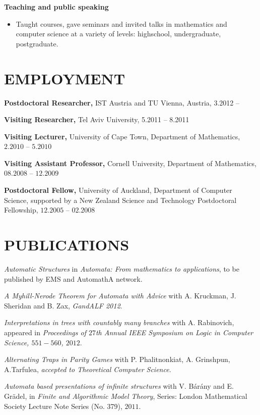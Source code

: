 \documentclass{res}
\begin{document}
\begin{resume}
  {\bf Teaching and public speaking}
        \begin{itemize}
        \item[] Taught courses, gave seminars and invited talks in mathematics and computer science at a variety of levels: highschool,  undergraduate, postgraduate.
        
        \end{itemize}
 
\section{EMPLOYMENT} 
\vspace{0.1in} 

{\bf Postdoctoral Researcher,}  IST Austria and TU Vienna, Austria, 3.2012 --

   {\bf Visiting Researcher,} Tel Aviv University, 5.2011 -- 8.2011 
   
  {\bf Visiting Lecturer,} University of Cape Town, Department of Mathematics, $2.2010$ -- $5.2010$

{\bf   Visiting Assistant Professor,} Cornell University, Department of Mathematics,
 $08.2008$ -- $12.2009$

{\bf Postdoctoral Fellow,} University of Auckland,
 Department of Computer Science,
  supported by a New Zealand Science and Technology Postdoctoral
 Fellowship,
 $12.2005$ -- $02.2008$\\
 
\section{PUBLICATIONS} 
\vspace{0.1in}

{\it Automatic Structures} in {\it Automata: From mathematics to applications}, to be published by EMS and AutomathA network.

{\it A Myhill-Nerode Theorem for Automata with Advice} with A. Kruckman, J. Sheridan and B. Zax, {\it GandALF 2012}.

{\it Interpretations in trees with countably many branches} with A. Rabinovich,  appeared in {\it Proceedings of 
$27$th Annual {IEEE} Symposium on Logic in Computer Science, $551-560$, $2012$}. 

{\it Alternating Traps in Parity Games} with P. Phalitnonkiat, A. Grinshpun, A.Tarfulea, {\it accepted to {\em Theoretical Computer Science}}.

{\it Automata based presentations of infinite structures} with V. B{\'a}r{\'a}ny and E. Gr{\"a}del,
in {\it Finite and Algorithmic Model Theory},
Series: London Mathematical Society Lecture Note Series (No. 379), $2011$.


\end{resume}
\end{document}
